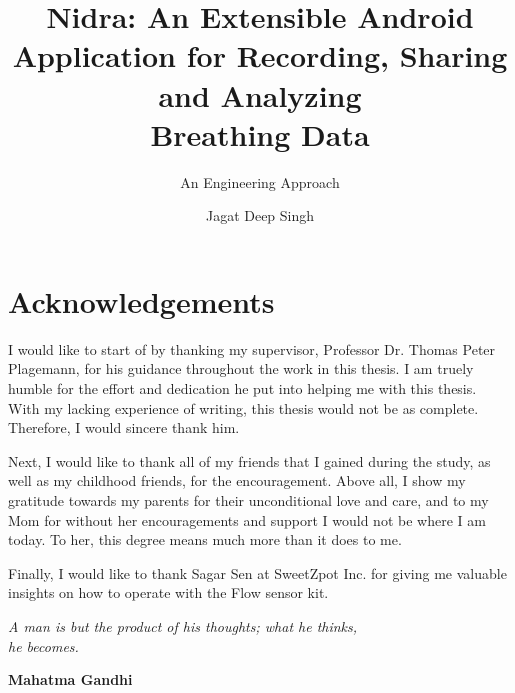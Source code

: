 \documentclass[UKenglish]{ifimaster}  %
\title{Nidra: An Extensible Android Application for Recording, Sharing and Analyzing \\ Breathing Data}
\subtitle{An Engineering Approach}
\author{Jagat Deep Singh}
\begin{document}
\duoforside[dept={Department of Informatics},   %
  program={Programming and Networks},  %
  long]                                        %

\frontmatter{}
\chapter*{Acknowledgements}
I would like to start of by thanking my supervisor, Professor Dr. Thomas Peter Plagemann, for his guidance throughout the work in this thesis. I am truely humble for the effort and dedication he put into helping me with this thesis. With my lacking experience of writing, this thesis would not be as complete. Therefore, I would sincere thank him. 

Next, I would like to thank all of my friends that I gained during the study, as well as my childhood friends, for the encouragement. Above all, I show my gratitude towards my parents for their unconditional love and care, and to my Mom for without her encouragements and support I would not be where I am today. To her, this degree means much more than it does to me.

Finally, I would like to thank Sagar Sen at SweetZpot Inc. for giving me valuable insights on how to operate with the Flow sensor kit. 

\vspace*{\fill}

\epigraph{\hfill{\textit{A man is but the product of his thoughts; what he thinks, \\he becomes.}}}{\textbf{Mahatma Gandhi}}
\end{document}
